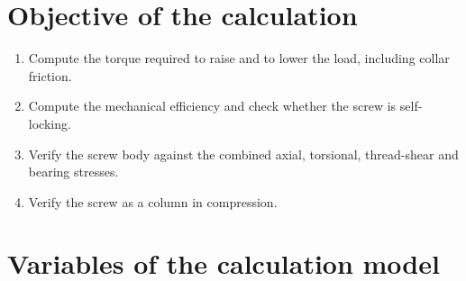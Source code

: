 \documentclass[11pt]{article}
\begin{document}
\section{Objective of the calculation}\label{sec:scr-obj}

\begin{enumerate}[leftmargin=*,nosep]
  \item Compute the torque required to raise and to lower the load, including collar friction.
  \item Compute the mechanical efficiency and check whether the screw is self-locking.
  \item Verify the screw body against the combined axial, torsional, thread-shear and
        bearing stresses.
  \item Verify the screw as a column in compression.
\end{enumerate}

\section{Variables of the calculation model}\label{sec:scr-var}
\end{document}
